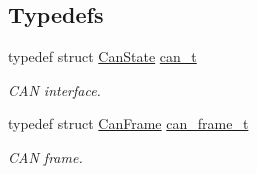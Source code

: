 \subsection*{Typedefs}
\begin{DoxyCompactItemize}
\item 
typedef struct \hyperlink{struct_can_state}{Can\-State} \hyperlink{group___c_a_n_ga9c929a51dc60dc74c97e7f3c4bb76300}{can\-\_\-t}
\begin{DoxyCompactList}\small\item\em C\-A\-N interface. \end{DoxyCompactList}\item 
typedef struct \hyperlink{struct_can_frame}{Can\-Frame} \hyperlink{group___c_a_n_ga78ee122f82484a1d73d82b66b1000d64}{can\-\_\-frame\-\_\-t}
\begin{DoxyCompactList}\small\item\em C\-A\-N frame. \end{DoxyCompactList}\end{DoxyCompactItemize}
